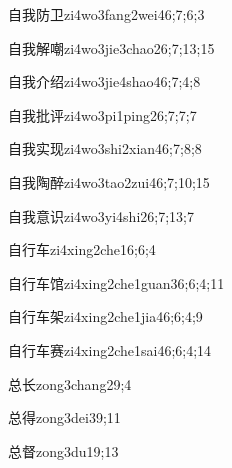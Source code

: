 \begin{verbete}{自我防卫}{zi4wo3fang2wei4}{6;7;6;3}
\end{verbete}
\begin{verbete}{自我解嘲}{zi4wo3jie3chao2}{6;7;13;15}
\end{verbete}
\begin{verbete}{自我介绍}{zi4wo3jie4shao4}{6;7;4;8}
\end{verbete}
\begin{verbete}{自我批评}{zi4wo3pi1ping2}{6;7;7;7}
\end{verbete}
\begin{verbete}{自我实现}{zi4wo3shi2xian4}{6;7;8;8}
\end{verbete}
\begin{verbete}{自我陶醉}{zi4wo3tao2zui4}{6;7;10;15}
\end{verbete}
\begin{verbete}{自我意识}{zi4wo3yi4shi2}{6;7;13;7}
\end{verbete}
\begin{verbete}{自行车}{zi4xing2che1}{6;6;4}
\end{verbete}
\begin{verbete}{自行车馆}{zi4xing2che1guan3}{6;6;4;11}
\end{verbete}
\begin{verbete}{自行车架}{zi4xing2che1jia4}{6;6;4;9}
\end{verbete}
\begin{verbete}{自行车赛}{zi4xing2che1sai4}{6;6;4;14}
\end{verbete}
\begin{verbete}{总长}{zong3chang2}{9;4}
\end{verbete}
\begin{verbete}{总得}{zong3dei3}{9;11}
\end{verbete}
\begin{verbete}{总督}{zong3du1}{9;13}
\end{verbete}
